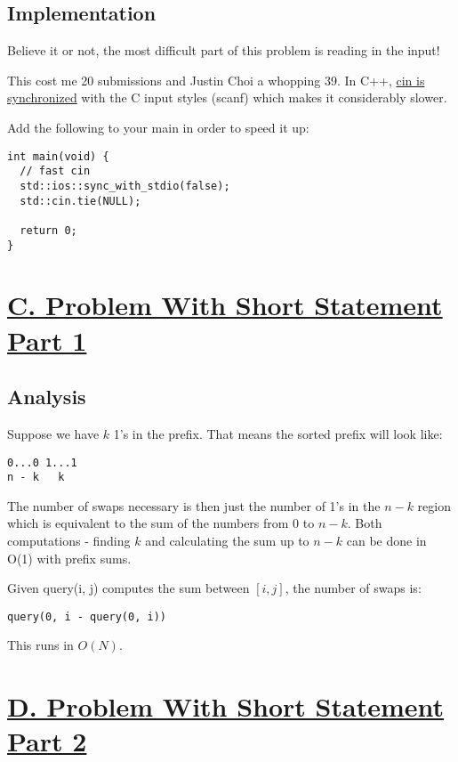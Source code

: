 \documentclass[11pt, oneside]{article}
\begin{document}
\subsection{Implementation}

Believe it or not, the most difficult part of this problem is reading in the input!

This cost me 20 submissions and Justin Choi a whopping 39.
In C++, \href{https://en.cppreference.com/w/cpp/io/ios_base/sync_with_stdio}{cin is synchronized} with the C input styles (scanf) which makes it considerably slower.

Add the following to your main in order to speed it up:
\begin{verbatim}
int main(void) {
  // fast cin
  std::ios::sync_with_stdio(false);
  std::cin.tie(NULL);

  return 0;
}
\end{verbatim}

\newpage

\section{\href{https://codeforces.com/group/M4wsRWBHyZ/contest/259141/problem/C}{C. Problem With Short Statement Part 1}}

\subsection{Analysis}
Suppose we have \( k \) 1's in the prefix.
That means the sorted prefix will look like:

\begin{verbatim}
0...0 1...1
n - k   k
\end{verbatim}

The number of swaps necessary is then just the number of 1's in
the \( n - k \) region which is equivalent to the sum of the numbers from 0 to \( n - k \). Both computations - finding \( k \) and calculating the sum up to \( n - k \) can be done in O(1) with prefix sums.

Given query(i, j) computes the sum between \( [i, j] \), the number of swaps is:
\begin{verbatim}
query(0, i - query(0, i))
\end{verbatim}

This runs in \( O(N) \).

\section{\href{https://codeforces.com/group/M4wsRWBHyZ/contest/259141/problem/D}{D. Problem With Short Statement Part 2}}
\end{document}
